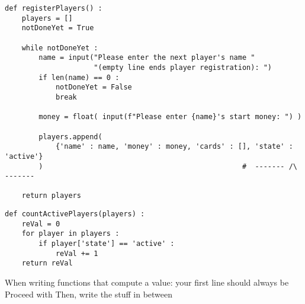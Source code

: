 
\begin{frame}[fragile]
%
\begin{codebox}
\begin{verbatim}
def registerPlayers() :
    players = []
    notDoneYet = True
    
    while notDoneYet :
        name = input("Please enter the next player's name "
                     "(empty line ends player registration): ")
        if len(name) == 0 :
            notDoneYet = False
            break
        
        money = float( input(f"Please enter {name}'s start money: ") )
        
        players.append(
            {'name' : name, 'money' : money, 'cards' : [], 'state' : 'active'}
        )                                               #  ------- /\ -------
    
    return players
\end{verbatim}
\end{codebox}
%
\end{frame}


\begin{frame}[fragile]
%
\begin{codebox}
\begin{verbatim}
def countActivePlayers(players) :
    reVal = 0
    for player in players :
        if player['state'] == 'active' :
            reVal += 1
    return reVal
\end{verbatim}
\end{codebox}
%
\begin{hintbox}
When writing functions that compute a value: your first line should always be
Proceed with
Then, write the stuff in between
\end{hintbox}
%
\end{frame}


